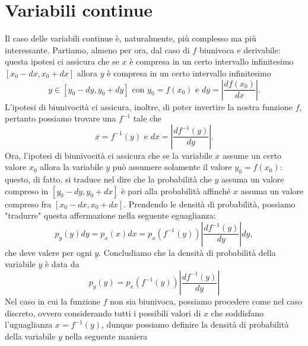 \documentclass{report}
\begin{document}
\section{Variabili continue}
Il caso delle variabili continue è, naturalmente, più complesso ma più interessante. Partiamo, almeno per ora, dal caso di $f$ biunivoca e derivabile: questa ipotesi ci assicura che se $x$ è compresa in un certo intervallo infinitesimo $[x_0 - dx, x_0 + dx]$ allora $y$ è compresa in un certo intervallo infinitesimo
$$
y \in [y_0 - dy, y_0 + dy] \text{ con } y_0 = f(x_0) \text{ e } dy = |\frac{df(x_0)}{dx}|.
$$
L'ipotesi di biunivocità ci assicura, inoltre, di poter invertire la nostra funzione $f$, pertanto possiamo trovare una $f^{-1}$ tale che
$$
	x = f^{-1}(y) \text{ e } dx = |\frac{df^{-1}(y)}{dy}|.
$$
Ora, l'ipotesi di biunivocità ci assicura che se la variabile $x$ assume un certo valore $x_0$ allora la variabile $y$ può assumere solamente il valore $y_0 = f(x_0)$: questo, di fatto, si traduce nel dire che la probabilità che $y$ assuma un valore compreso in $[y_0 - dy, y_0 + dx]$ è pari alla probabilità affinché $x$ assuma un valore compreso fra $[x_0 - dx, x_0 + dx]$. Prendendo le densità di probabilità, possiamo "tradurre" questa affermazione nella seguente eguaglianza:
$$
	p_y(y)dy = p_x(x)dx = p_x(f^{-1}(y)) \left| \frac{df^{-1}(y)}{dy} \right| dy, 
$$
che deve valere per ogni $y$. Concludiamo che la densità di probabilità della variabile $y$ è data da
$$
	p_y(y) = p_x(f^{-1}(y)) \left| \frac{df^{-1}(y)}{dy} \right|
$$
Nel caso in cui la funzione $f$ non sia biunivoca, possiamo procedere come nel caso discreto, ovvero considerando tutti i possibili valori di $x$ che soddisfano l'uguaglianza $x = f^{-1}(y)$, dunque possiamo definire la densità di probabilità della variabile $y$ nella seguente maniera
\end{document}
